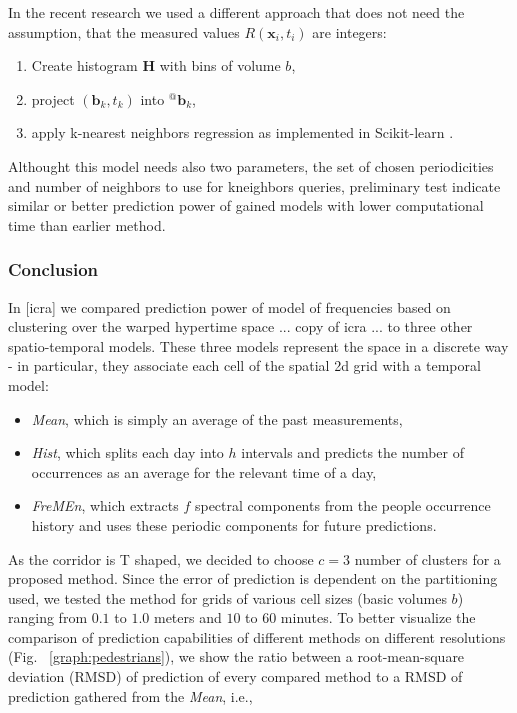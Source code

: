 In the recent research we used a different approach that does not need the assumption, that the measured values $R\left(\mathbf{x}_i, t_i\right)$ are integers:
\begin{enumerate}
    \item Create histogram $\mathbf{H}$ with bins of volume $b$,
    \item project $\left(\mathbf{b}_{k}, t_{k}\right)$ into ${}^{@}\mathbf{b}_{k}$,
    \item apply k-nearest neighbors regression \cite{altman1992introduction} as implemented in Scikit-learn \cite{scikit-learn}.
\end{enumerate}
%
Althought this model needs also two parameters, the set of chosen periodicities and number of neighbors to use for kneighbors queries, preliminary test indicate similar or better prediction power of gained models with lower computational time than earlier method.


\subsubsection{Conclusion}

In [icra] we compared prediction power of model of frequencies based on clustering over the warped hypertime space 
... copy of icra ... to three other spatio-temporal models. 
These three models represent the space in a discrete way - in particular, they associate each cell of the spatial 2d grid with a temporal model: 
\begin{itemize}
	\item \textit{Mean}, which is simply an average of the past measurements, 
	\item \textit{Hist}, which splits each day into $h$ intervals and predicts the number of occurrences as an average for the relevant time of a day, 
	\item \textit{FreMEn}, which extracts $f$ spectral components from the people occurrence history and uses these periodic components for future predictions.
\end{itemize}
As the corridor is T shaped, we decided to choose $c = 3$ number of clusters for a proposed method. 
Since the error of prediction is dependent on the partitioning used, we tested the method for grids of various cell sizes (basic volumes $b$) ranging from $0.1$ to $1.0$ meters and $10$ to $60$ minutes.
To better visualize the comparison of prediction capabilities of different methods on different resolutions (Fig. ~\ref{graph:pedestrians}), we show the ratio between a root-mean-square deviation \cite{hyndman2006another} (RMSD) of prediction of every compared method to a RMSD of prediction gathered from the \textit{Mean}, i.e.,

